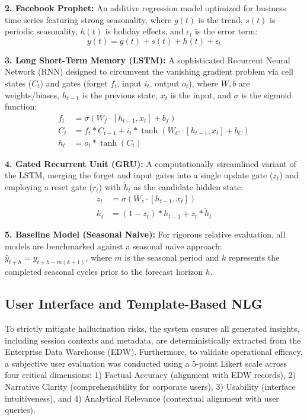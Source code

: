 \documentclass[conference]{IEEEtran}
\begin{document}
\textbf{2. Facebook Prophet:}
An additive regression model optimized for business time series featuring strong seasonality, where $g(t)$ is the trend, $s(t)$ is periodic seasonality, $h(t)$ is holiday effects, and $\epsilon_t$ is the error term:
\begin{equation}
y(t) = g(t) + s(t) + h(t) + \epsilon_t
\end{equation}

\textbf{3. Long Short-Term Memory (LSTM):}
A sophisticated Recurrent Neural Network (RNN) designed to circumvent the vanishing gradient problem via cell states ($C_t$) and gates (forget $f_t$, input $i_t$, output $o_t$), where $W, b$ are weights/biases, $h_{t-1}$ is the previous state, $x_t$ is the input, and $\sigma$ is the sigmoid function:
\begin{equation}
\begin{aligned}
f_t &= \sigma(W_f \cdot [h_{t-1}, x_t] + b_f) \\
C_t &= f_t \ast C_{t-1} + i_t \ast \tanh(W_C \cdot [h_{t-1}, x_t] + b_C) \\
h_t &= o_t \ast \tanh(C_t)
\end{aligned}
\end{equation}

\textbf{4. Gated Recurrent Unit (GRU):}
A computationally streamlined variant of the LSTM, merging the forget and input gates into a single update gate ($z_t$) and employing a reset gate ($r_t$) with $\tilde{h}_t$ as the candidate hidden state:
\begin{equation}
\begin{aligned}
z_t &= \sigma(W_z \cdot [h_{t-1}, x_t]) \\
h_t &= (1 - z_t) \ast h_{t-1} + z_t \ast \tilde{h}_t
\end{aligned}
\end{equation}

\textbf{5. Baseline Model (Seasonal Naive):}
For rigorous relative evaluation, all models are benchmarked against a seasonal naive approach: $\hat{y}_{t+h} = y_{t+h-m(k+1)}$, where $m$ is the seasonal period and $k$ represents the completed seasonal cycles prior to the forecast horizon $h$.

\subsection{User Interface and Template-Based NLG}
To strictly mitigate hallucination risks, the system ensures all generated insights, including session contexts and metadata, are deterministically extracted from the Enterprise Data Warehouse (EDW). Furthermore, to validate operational efficacy, a subjective user evaluation was conducted using a 5-point Likert scale across four critical dimensions: 1) Factual Accuracy (alignment with EDW records), 2) Narrative Clarity (comprehensibility for corporate users), 3) Usability (interface intuitiveness), and 4) Analytical Relevance (contextual alignment with user queries).
\end{document}

